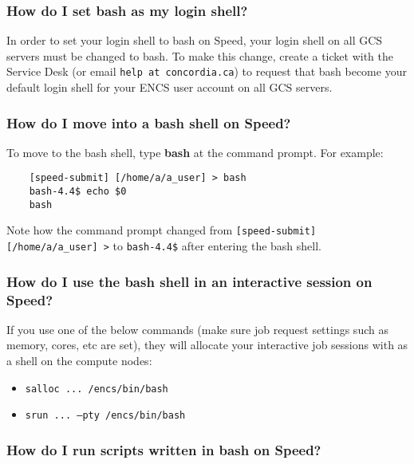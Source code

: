 \subsubsection{How do I set bash as my login shell?}

In order to set your login shell to bash on Speed, your login shell on all GCS servers must be changed to bash.
To make this change, create a ticket with the Service Desk (or email \texttt{help at concordia.ca}) to
request that bash become your default login shell for your ENCS user account on all GCS servers.

\subsubsection{How do I move into a bash shell on Speed?}

To move to the bash shell, type \textbf{bash} at the command prompt.
For example:
\begin{verbatim}
	[speed-submit] [/home/a/a_user] > bash
	bash-4.4$ echo $0
	bash
\end{verbatim}	

Note how the command prompt changed from \verb![speed-submit] [/home/a/a_user] >! to \verb!bash-4.4$! after entering the bash shell.

\subsubsection{How do I use the bash shell in an interactive session on Speed?}
If you use one of the below commands (make sure job request settings such
as memory, cores, etc are set), they will allocate your interactive
job sessions with  as a shell on the compute nodes:

\begin{itemize}
	\item \texttt{salloc ... /encs/bin/bash}
	\item \texttt{srun ... --pty /encs/bin/bash}
\end{itemize}

\subsubsection{How do I run scripts written in bash on Speed?}

